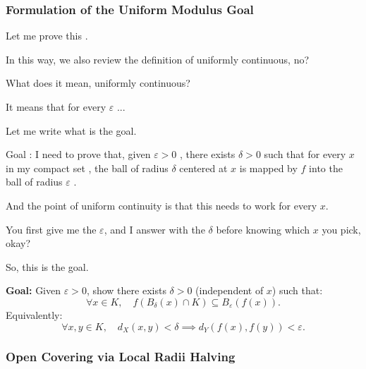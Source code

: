 \begin{proofWrapper}

\subsubsection{Formulation of the Uniform Modulus Goal}

\begin{speech}[01:15:07 - 01:16:18]
Let me prove this .

In this way, we also review the definition of uniformly continuous, no?

What does it mean, uniformly continuous?

It means that for every $\varepsilon$ ...

Let me write what is the goal.

Goal : I need to prove that, given $\varepsilon > 0$ , there exists $\delta > 0$  such that for every $x$ in my compact set , the ball of radius $\delta$ centered at $x$ is mapped by $f$ into the ball of radius $\varepsilon$ .

And the point of uniform continuity is that this needs to work for every $x$.

You first give me the $\varepsilon$, and I answer with the $\delta$ before knowing which $x$ you pick, okay?

So, this is the goal.
\end{speech}

\begin{content}
\textbf{Goal:} Given $\varepsilon > 0$, show there exists $\delta > 0$ (independent of $x$) such that:
\begin{equation}\label{eq:goal-uniform-continuity}
\forall x \in K, \quad f(B_\delta(x) \cap K) \subseteq B_\varepsilon(f(x)).
\end{equation}
Equivalently:
\[
\forall x, y \in K, \quad d_X(x, y) < \delta \implies d_Y(f(x), f(y)) < \varepsilon.
\]
\end{content}

\subsubsection{Open Covering via Local Radii Halving}


\end{proofWrapper}
